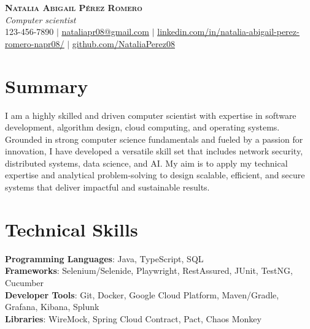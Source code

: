 \documentclass[letterpaper,11pt]{article}
\begin{document}

\begin{center}
    \textbf{\Huge \scshape Natalia Abigail Pérez Romero} \\ \vspace{1pt}
    \small \textit{Computer scientist} \\
    123-456-7890 $|$ \href{mailto:nataliapr08@gmail.com}{\underline{nataliapr08@gmail.com}} $|$ 
    \href{www.linkedin.com/in/natalia-abigail-perez-romero-napr08}{\underline{linkedin.com/in/natalia-abigail-perez-romero-napr08/}} $|$
    \href{https://github.com/NataliaPerez08}{\underline{github.com/NataliaPerez08}}
\end{center}

\section*{Summary}
I am a highly skilled and driven computer scientist with expertise in software development, algorithm design, cloud computing, and operating systems. Grounded in strong computer science fundamentals and fueled by a passion for innovation, I have developed a versatile skill set that includes network security, distributed systems, data science, and AI. My aim is to apply my technical expertise and analytical problem-solving to design scalable, efficient, and secure systems that deliver impactful and sustainable results.

\section{Technical Skills}
 \begin{itemize}[leftmargin=0.15in, label={}]
    \small{\item{
     \textbf{Programming Languages}{: Java, TypeScript, SQL} \\
     \textbf{Frameworks}{: Selenium/Selenide, Playwright, RestAssured, JUnit, TestNG, Cucumber} \\
     \textbf{Developer Tools}{: Git, Docker, Google Cloud Platform, Maven/Gradle, Grafana, Kibana, Splunk} \\
     \textbf{Libraries}{: WireMock, Spring Cloud Contract, Pact, Chaos Monkey}
    }}
 \end{itemize}
\end{document}
